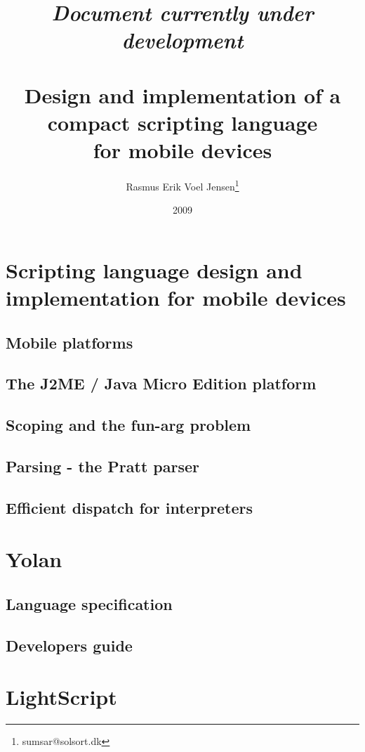 \documentclass[11pt]{report}
\title{
\emph{Document currently under development} \\ ~ \\
Design and implementation of a \\
compact scripting language \\ 
for mobile devices}
\author{
  Rasmus Erik Voel Jensen\footnote{
    sumsar@solsort.dk
  }
}
\date{2009}
\begin{document}


\setcounter{tocdepth}{1}
\tableofcontents
%

\part{Scripting language design and implementation for mobile devices}
  \chapter{Mobile platforms}
  \chapter{The J2ME / Java Micro Edition platform}
  \chapter{Scoping and the fun-arg problem}
  \chapter{Parsing - the Pratt parser}
    
  \chapter{Efficient dispatch for interpreters}
\part{Yolan}
  \chapter{Language specification}
  \chapter{Developers guide}
\part{LightScript}

%
%

%
%


\end{document}
